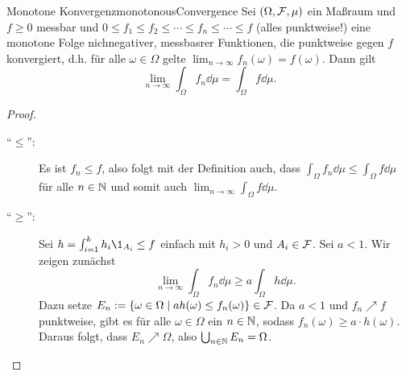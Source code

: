 \documentclass[language=ngerman]{../../Template/TemplateLecture}
\begin{document}
\begin{thm}{Monotone Konvergenz}{monotonousConvergence}
    Sei $(\Omega, \mathcal{F}, \mu)$ ein Maßraum und $f \geq 0$ messbar und $0 \leq f_1 \leq f_2 \leq \cdots \leq f_n \leq \cdots \leq f$ (alles punktweise!) eine monotone Folge nichnegativer, messbasrer Funktionen, die punktweise gegen $f$ konvergiert, d.h. für alle $\omega \in \Omega$ gelte $\lim_{n \to \infty} f_n(\omega) = f(\omega)$. Dann gilt 
    \begin{equation}
        \lim_{n \to \infty} \int_\Omega f_n \dd\mu = \int_\Omega f \dd\mu.
    \end{equation}
\end{thm}
\begin{proof}
    \begin{description}
        \item[\enquote{$\leq$}:] Es ist $f_n \leq f$, also folgt mit der Definition auch, dass $\int_\Omega f_n \dd\mu \leq \int_\Omega f\dd\mu$ für alle $n \in \mathbb{N}$ und somit auch $\lim_{n \to \infty} \int_\Omega f\dd\mu$.
        \item[\enquote{$\geq$}:] Sei $h = \int_{i = 1}^k h_i \1_{A_i} \leq f$ einfach mit $h_i > 0$ und $A_i \in \mathcal{F}$. Sei $a < 1$. Wir zeigen zunächst 
        \begin{equation}
            \lim_{n \to \infty} \int_\Omega f_n \dd\mu \geq a\int_\Omega h\dd\mu.
        \end{equation} 
        Dazu setze $E_n := \{\omega \in \Omega \mid ah(\omega) \leq f_n(\omega)\} \in \mathcal{F}$. Da $a < 1$ und $f_n \nearrow f$ punktweise, gibt es für alle $\omega \in \Omega$ ein $n \in \mathbb{N}$, sodass $f_n(\omega) \geq a \cdot h(\omega)$. Daraus folgt, dass $E_n \nearrow \Omega$, also $\bigcup_{n \in \mathbb{N}} E_n = \Omega$.


\end{description}
\end{proof}
\end{document}
